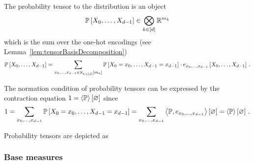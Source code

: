 The probability tensor to the distribution is an object
		\[ \mathbb{P}\left[X_{0},\ldots,X_{d-1}\right] \in \bigotimes_{k\in[d]}\mathbb{R}^{m_{k}} \]
which is the sum over the one-hot encodings (see Lemma~\ref{lem:tensorBasisDecomposition})
		\[ \mathbb{P}\left[X_{0},\ldots,X_{d-1}\right] = \sum_{x_{0},\ldots,x_{d-1}\in\bigtimes_{k\in[d]}[m_{k}]} \mathbb{P}\left[X_{0}=x_{0},\ldots,X_{d-1}=x_{d-1}\right] \cdot e_{x_{0},\ldots,x_{d-1}}\left[X_{0},\ldots,X_{d-1}\right] \, . \]
		
The normation condition of probability tensors can be expressed by the contraction equation $1= \left\langle \mathbb{P}\right\rangle \left[ \varnothing \right]$ since
\begin{align*}
	1 = \sum_{x_{0},\ldots,x_{d-1}}\mathbb{P}\left[X_{0}=x_{0},\ldots,X_{d-1}=x_{d-1}\right]
	=  \sum_{x_{0},\ldots,x_{d-1}}\left\langle \mathbb{P}, e_{x_{0},\ldots,x_{d-1}}\right\rangle \left[ \varnothing \right]
	= \left\langle \mathbb{P}\right\rangle \left[ \varnothing \right] \, . 
\end{align*}



Probability tensors are depicted as
\begin{center}
	
\end{center}

\subsubsection{Base measures}


